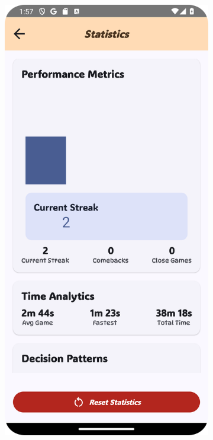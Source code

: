 \begin{figure}[h]
    \centering
    \begin{subfigure}[b]{0.27\textwidth}
        \includegraphics[width=\textwidth]{img/statistics screen.png}

\end{subfigure}
\end{figure}
